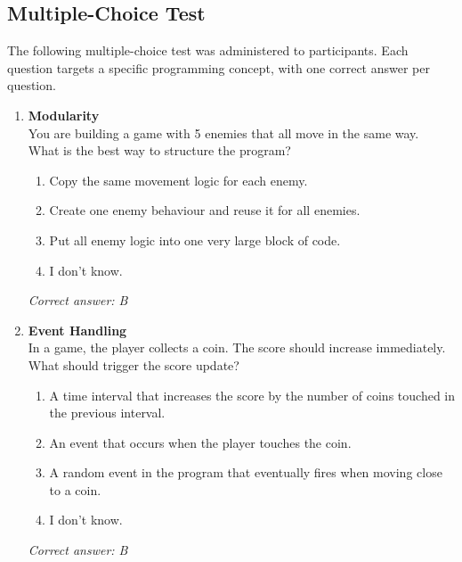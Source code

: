 \subsection{Multiple-Choice Test}

The following multiple-choice test was administered to participants. Each question targets a specific programming concept, with one correct answer per question.

\begin{enumerate}

	\item \textbf{Modularity} \\
	      You are building a game with 5 enemies that all move in the same way. \\[0.5em]
	      What is the best way to structure the program?
	      \begin{enumerate}
		      \item Copy the same movement logic for each enemy.
		      \item Create one enemy behaviour and reuse it for all enemies.
		      \item Put all enemy logic into one very large block of code.
		      \item I don't know.
	      \end{enumerate}
	      \textit{Correct answer: B}

	\item \textbf{Event Handling} \\
	      In a game, the player collects a coin. The score should increase immediately. \\[0.5em]
	      What should trigger the score update?
	      \begin{enumerate}
		      \item A time interval that increases the score by the number of coins touched in the previous interval.
		      \item An event that occurs when the player touches the coin.
		      \item A random event in the program that eventually fires when moving close to a coin.
		      \item I don't know.
	      \end{enumerate}
	      \textit{Correct answer: B}


\end{enumerate}
